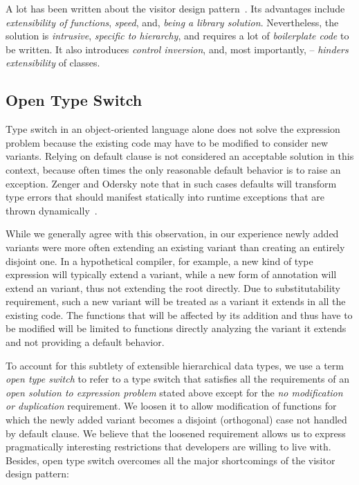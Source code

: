 A lot has been written about the visitor design pattern~\cite{DesignPatterns1993,Palsberg98,Zenger:2001,Oliveira08}. 
Its advantages include \emph{extensibility of functions}, \emph{speed}, and, 
\emph{being a library solution}. Nevertheless, the solution is \emph{intrusive}, 
\emph{specific to hierarchy}, and requires a lot of \emph{boilerplate code} to 
be written. It also introduces \emph{control inversion}, and, most importantly, 
-- \emph{hinders extensibility} of classes.


\subsection{Open Type Switch}

Type switch in an object-oriented language alone 
does not solve the expression problem because the existing code may have to be 
modified to consider new variants. Relying on default clause is not 
considered an acceptable solution in this context, because often times the 
only reasonable default behavior is to raise an exception. Zenger and Odersky 
note that in such cases defaults will transform type errors that should manifest 
statically into runtime exceptions that are thrown dynamically~\cite{fool12}.

While we generally agree with this observation, 
in our experience newly added variants were more often extending an existing 
variant than creating an entirely disjoint one. In a hypothetical compiler, for 
example, a new kind of type expression will typically extend a 
 variant, while a new form of annotation will extend an 
 variant, thus not extending the root  directly. 
Due to substitutability requirement, such a new variant will be treated as a 
variant it extends in all the existing code. The functions that will be affected 
by its addition and thus have to be modified will be limited to functions 
directly analyzing the variant it extends and not providing a default behavior.

To account for this subtlety of extensible hierarchical data types, we use a 
term \emph{open type switch} to refer to a type switch that satisfies all the 
requirements of an \emph{open solution to expression problem} stated above 
except for the \emph{no modification or duplication} requirement. We loosen it 
to allow modification of functions for which the newly added variant becomes a 
disjoint (orthogonal) case not handled by default clause. We believe that the 
loosened requirement allows us to express pragmatically interesting restrictions 
that developers are willing to live with. Besides, open type switch overcomes 
all the major shortcomings of the visitor design pattern:

